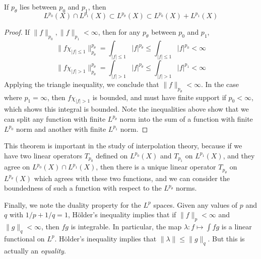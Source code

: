 \begin{theorem}
  If $p_\theta$ lies between $p_0$ and $p_1$, then
  \[ L^{p_0}(X) \cap L^{p_1}(X) \subset L^{p_\theta}(X) \subset L^{p_0}(X) + L^{p_1}(X) \]
\end{theorem}
\begin{proof}
  If $\| f \|_{p_0}, \| f \|_{p_1} < \infty$, then for any $p_\theta$ between $p_0$ and $p_1$,
  \[ \| f \chi_{|f| \leq 1} \|_{p_\theta}^{p_\theta} = \int_{|f| \leq 1} |f|^{p_\theta} \leq \int_{|f| \leq 1} |f|^{p_0} < \infty \]
  \[ \| f \chi_{|f| > 1} \|_{p_\theta}^{p_\theta} = \int_{|f| > 1} |f|^{p_\theta} \leq \int_{|f| > 1} |f|^{p_1} < \infty \]
  Applying the triangle inequality, we conclude that $\| f \|_{p_\theta} < \infty$. In the case where $p_1 = \infty$, then $f \chi_{|f| > 1}$ is bounded, and must have finite support if $p_0 < \infty$, which shows this integral is bounded. Note the inequalities above show that we can split any function with finite $L^{p_\theta}$ norm into the sum of a function with finite $L^{p_0}$ norm and another with finite $L^{p_1}$ norm.
\end{proof}

This theorem is important in the study of interpolation theory, because if we have two linear operators $T_{p_0}$ defined on $L^{p_0}(X)$ and $T_{p_1}$ on $L^{p_1}(X)$, and they agree on $L^{p_0}(X) \cap L^{p_1}(X)$, then there is a unique linear operator $T_{p_\theta}$ on $L^{p_\theta}(X)$ which agrees with these two functions, and we can consider the boundedness of such a function with respect to the $L^{p_\theta}$ norms.

Finally, we note the duality property for the $L^p$ spaces. Given any values of $p$ and $q$ with $1/p + 1/q = 1$, H\"{o}lder's inequality implies that if $\| f \|_p < \infty$ and $\| g \|_q < \infty$, then $fg$ is integrable. In particular, the map $\lambda: f \mapsto \int fg$ is a linear functional on $L^p$. H\"{o}lder's inequality implies that $\| \lambda \| \leq \| g \|_q$. But this is actually an \emph{equality}.

